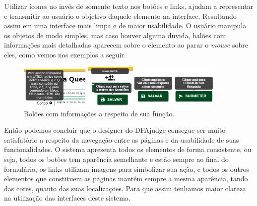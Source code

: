 \documentclass[
	12pt,				%
	openany,
	oneside,
	a4paper,			%
	english,			%
	brazil				%
	]{abntex2}
\begin{document}
  Utilizar ícones ao invés de somente texto nos botões e links, ajudam a representar e transmitir ao usuário o objetivo daquele elemento na interface. Resultando assim em uma interface mais limpa e de maior usabilidade. O usuário manipula os objetos de modo simples, mas caso houver alguma duvida, balões com informações mais detalhadas aparecem sobre o elemento ao parar o \textit{mouse} sobre eles, como vemos nos exemplos a seguir.

\begin{figure}[H]
  \centering
  \includegraphics[width=0.9\textwidth]{prints/tooltip.png}
  \caption{Bolões com informações a respeito de sua função.}
  \label{print:tooltip}
  \vspace{-0.5cm}
\end{figure}

  Então podemos concluir que o designer do DFAjudge consegue ser muito satisfatório a respeito da navegação entre as páginas e da usabilidade de suas funcionalidades. O sistema apresenta todos os elementos de forma consistente, ou seja, todos os botões tem aparência semelhante e estão sempre ao final do formulário, os links utilizam imagens para simbolizar sua ação, e todos os outros elementos que constituem as páginas mantêm sempre a mesma aparência, tando das cores, quanto das suas localizações. Para que assim tenhamos maior clareza na utilização das interfaces deste sistema. 


\end{document}

